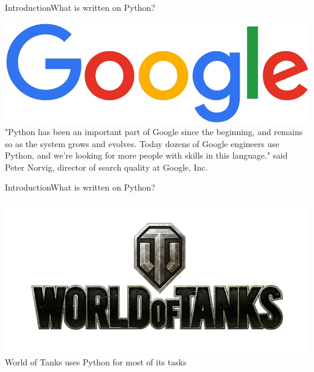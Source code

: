 \documentclass[10pt]{beamer}
\begin{document}
\begin{frame}{Introduction}{What is written on Python?}
	\begin{center}
		\includegraphics[width=1\textwidth]{pictures/google.png}
		\\"Python has been an important part of Google since the beginning, and remains so as the system grows and evolves. Today dozens of Google engineers use Python, and we're looking for more people with skills in this language." said Peter Norvig, director of search quality at Google, Inc.
	\end{center}
\end{frame}

\begin{frame}{Introduction}{What is written on Python?}
	\begin{center}
		\includegraphics[width=1\textwidth]{pictures/world_of_tanks.png}
		\large{\\World of Tanks uses Python for most of its tasks}
	\end{center}
\end{frame}
\end{document}
